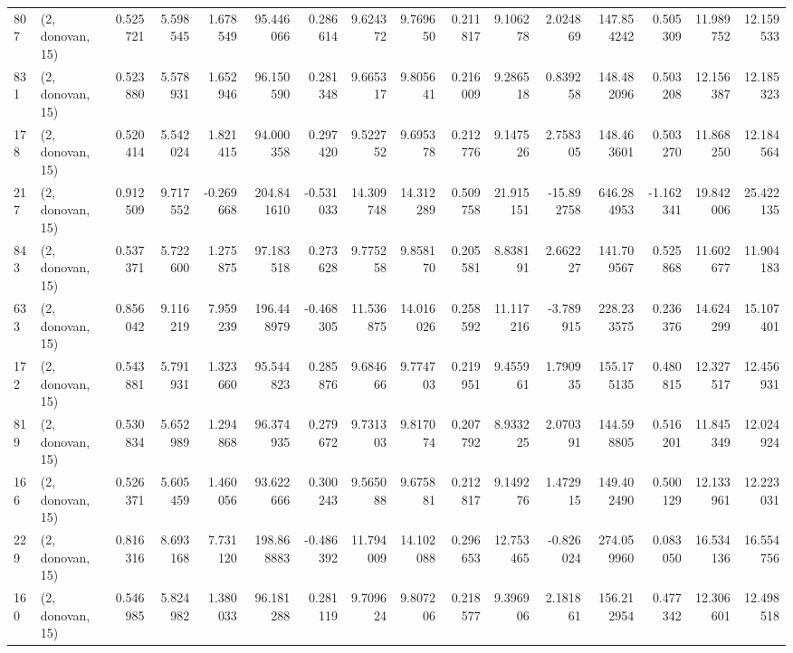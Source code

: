 \begin{tabular}{llrrrrrrrrrrrrrr}
807  &  (2, donovan, 15) &   0.525721 &   5.598545 &   1.678549 &     95.446066 &    0.286614 &    9.624372 &    9.769650 &  0.211817 &   9.106278 &   2.024869 &   147.854242 &   0.505309 &  11.989752 &  12.159533 \\
831  &  (2, donovan, 15) &   0.523880 &   5.578931 &   1.652946 &     96.150590 &    0.281348 &    9.665317 &    9.805641 &  0.216009 &   9.286518 &   0.839258 &   148.482096 &   0.503208 &  12.156387 &  12.185323 \\
178  &  (2, donovan, 15) &   0.520414 &   5.542024 &   1.821415 &     94.000358 &    0.297420 &    9.522752 &    9.695378 &  0.212776 &   9.147526 &   2.758305 &   148.463601 &   0.503270 &  11.868250 &  12.184564 \\
217  &  (2, donovan, 15) &   0.912509 &   9.717552 &  -0.269668 &    204.841610 &   -0.531033 &   14.309748 &   14.312289 &  0.509758 &  21.915151 & -15.892758 &   646.284953 &  -1.162341 &  19.842006 &  25.422135 \\
843  &  (2, donovan, 15) &   0.537371 &   5.722600 &   1.275875 &     97.183518 &    0.273628 &    9.775258 &    9.858170 &  0.205581 &   8.838191 &   2.662227 &   141.709567 &   0.525868 &  11.602677 &  11.904183 \\
633  &  (2, donovan, 15) &   0.856042 &   9.116219 &   7.959239 &    196.448979 &   -0.468305 &   11.536875 &   14.016026 &  0.258592 &  11.117216 &  -3.789915 &   228.233575 &   0.236376 &  14.624299 &  15.107401 \\
172  &  (2, donovan, 15) &   0.543881 &   5.791931 &   1.323660 &     95.544823 &    0.285876 &    9.684666 &    9.774703 &  0.219951 &   9.455961 &   1.790935 &   155.175135 &   0.480815 &  12.327517 &  12.456931 \\
819  &  (2, donovan, 15) &   0.530834 &   5.652989 &   1.294868 &     96.374935 &    0.279672 &    9.731303 &    9.817074 &  0.207792 &   8.933225 &   2.070391 &   144.598805 &   0.516201 &  11.845349 &  12.024924 \\
166  &  (2, donovan, 15) &   0.526371 &   5.605459 &   1.460056 &     93.622666 &    0.300243 &    9.565088 &    9.675881 &  0.212817 &   9.149276 &   1.472915 &   149.402490 &   0.500129 &  12.133961 &  12.223031 \\
229  &  (2, donovan, 15) &   0.816316 &   8.693168 &   7.731120 &    198.868883 &   -0.486392 &   11.794009 &   14.102088 &  0.296653 &  12.753465 &  -0.826024 &   274.059960 &   0.083050 &  16.534136 &  16.554756 \\
160  &  (2, donovan, 15) &   0.546985 &   5.824982 &   1.380033 &     96.181288 &    0.281119 &    9.709624 &    9.807206 &  0.218577 &   9.396906 &   2.181861 &   156.212954 &   0.477342 &  12.306601 &  12.498518 \\

\end{tabular}
